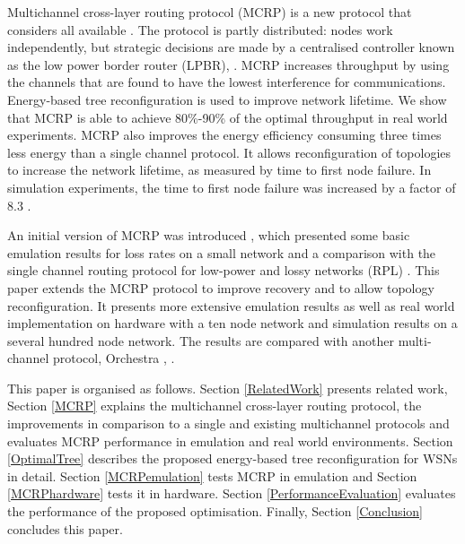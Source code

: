 Multichannel cross-layer routing protocol (MCRP) is a new protocol that considers all available . The protocol is partly distributed: nodes work independently, but strategic decisions are made by a centralised controller known as the low power border router (LPBR), . MCRP increases throughput by using the channels that are found to have the lowest interference for communications.
Energy-based tree reconfiguration is  used to improve network lifetime.  We show that MCRP is able to achieve 80\%-90\% of the optimal  throughput in real world experiments.
MCRP also improves the energy efficiency consuming three times less energy than a single channel protocol.  It allows reconfiguration of topologies to increase the network lifetime, as measured by time to first node failure.  In simulation experiments, the time to first node failure was increased by a factor of 8.3 .

An initial version of MCRP was introduced  \cite{mcrp}, which presented some basic emulation results for loss rates on a small network and a comparison with the single channel routing protocol for low-power and lossy networks (RPL) \cite{winter2012rpl}.  This paper extends the MCRP protocol to improve recovery and to allow topology reconfiguration.  It presents more extensive emulation results as well as real world implementation on hardware with a ten node network and simulation results on a several hundred node network.  The results are compared with another multi-channel protocol, Orchestra \cite{orchestra}, .

This paper is organised as follows. Section \ref{RelatedWork} presents  related work, Section \ref{MCRP} explains the multichannel cross-layer routing protocol, the improvements in comparison to a single and existing multichannel protocols and evaluates MCRP performance in emulation and real world environments.
Section \ref{OptimalTree} describes the proposed energy-based tree reconfiguration for WSNs in detail.  Section \ref{MCRPemulation} tests MCRP in emulation and Section \ref{MCRPhardware} tests it in hardware.
Section \ref{PerformanceEvaluation} evaluates the performance of the proposed optimisation. Finally, Section \ref{Conclusion} concludes this paper.
